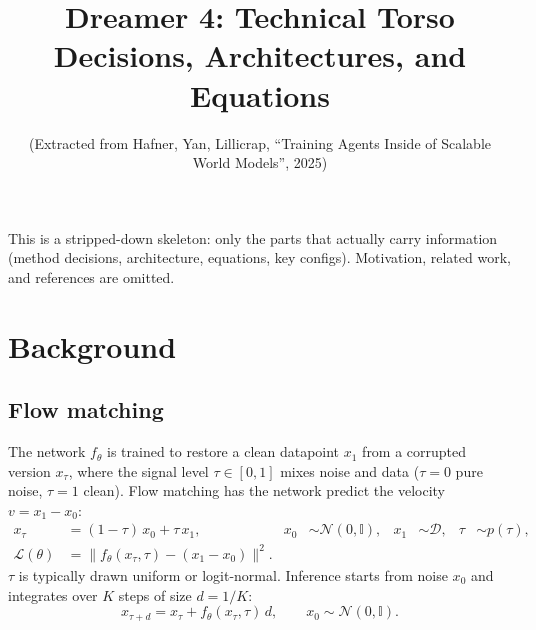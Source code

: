 \documentclass[11pt]{article}
\title{Dreamer 4: Technical Torso\\ \large Decisions, Architectures, and Equations}
\author{(Extracted from Hafner, Yan, Lillicrap, ``Training Agents Inside of Scalable World Models'', 2025)}
\date{}
\begin{document}
\maketitle

This is a stripped-down skeleton: only the parts that actually carry information
(method decisions, architecture, equations, key configs). Motivation, related work,
and references are omitted.

\section{Background}

\subsection{Flow matching}
The network $f_\theta$ is trained to restore a clean datapoint $x_1$ from a corrupted
version $x_\tau$, where the signal level $\tau \in [0,1]$ mixes noise and data
($\tau=0$ pure noise, $\tau=1$ clean). Flow matching has the network predict the
velocity $v = x_1 - x_0$:
\begin{align}
  x_\tau &= (1-\tau)\,x_0 + \tau\,x_1,
  &x_0 &\sim \mathcal{N}(0,\mathbb{I}),
  &x_1 &\sim \mathcal{D},
  &\tau &\sim p(\tau), \\
  \mathcal{L}(\theta) &= \big\| f_\theta(x_\tau,\tau) - (x_1 - x_0) \big\|^2 .
\end{align}
$\tau$ is typically drawn uniform or logit-normal. Inference starts from noise $x_0$
and integrates over $K$ steps of size $d = 1/K$:
\begin{equation}
  x_{\tau+d} = x_\tau + f_\theta(x_\tau,\tau)\,d, \qquad x_0 \sim \mathcal{N}(0,\mathbb{I}).
\end{equation}
\end{document}
